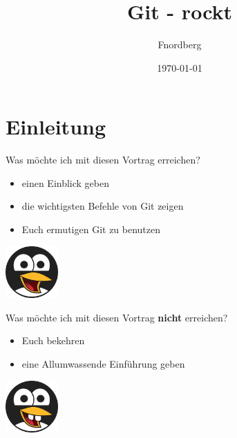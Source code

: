 \documentclass{beamer}
\title{Git - rockt}
\author{Fnordberg}
\date{\today}
\begin{document}
\maketitle

\section{Einleitung}

\begin{frame}{Was möchte ich mit diesen Vortrag erreichen?}
    \begin{minipage}[b]{80mm}
        \begin{itemize}
            \item einen Einblick geben
            \item die wichtigsten Befehle von Git zeigen
            \item Euch ermutigen Git zu benutzen
        \end{itemize}
    \end{minipage}
            \hfill
    \begin{minipage}[b]{20mm}
        \includegraphics[width=20mm]{pictures/pic-tux_1.png}
    \end{minipage}
\end{frame}

\begin{frame}{Was möchte ich mit diesen Vortrag 
                    \textbf{nicht} erreichen?}
                    
    \begin{minipage}[b]{80mm}
        \begin{itemize}
            \item Euch bekehren
            \item eine Allumwassende Einführung geben
        \end{itemize}
    \end{minipage}
        \hfill
    \begin{minipage}[b]{20mm}
         \includegraphics[width=20mm]{pictures/pic-tux_2.png}
    \end{minipage}

\end{frame}
\end{document}
